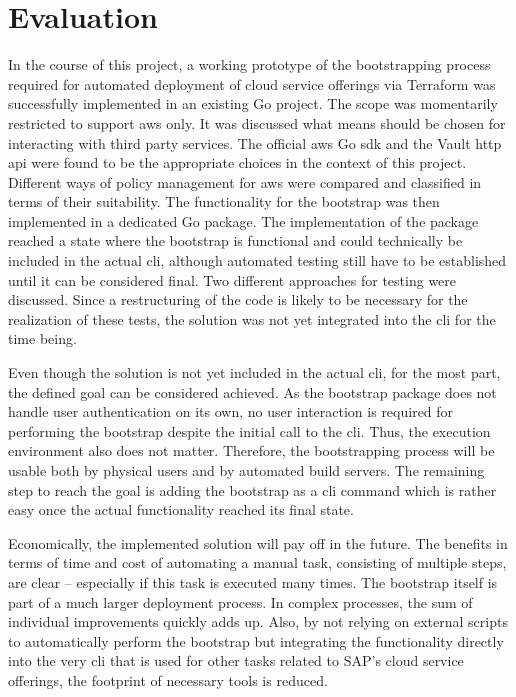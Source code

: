 \chapter{Evaluation}
In the course of this project, a working prototype of the bootstrapping process required for automated deployment of cloud service offerings via Terraform was successfully implemented in an existing Go project.
The scope was momentarily restricted to support \ac{aws} only.
It was discussed what means should be chosen for interacting with third party services.
The official \ac{aws} Go \ac{sdk} and the Vault \ac{http} \ac{api} were found to be the appropriate choices in the context of this project.
Different ways of policy management for \ac{aws} were compared and classified in terms of their suitability.
The functionality for the bootstrap was then implemented in a dedicated Go package.
The implementation of the package reached a state where the bootstrap is functional and could technically be included in the actual \ac{cli}, although automated testing still have to be established until it can be considered final.
Two different approaches for testing were discussed.
Since a restructuring of the code is likely to be necessary for the realization of these tests, the solution was not yet integrated into the \ac{cli} for the time being.

Even though the solution is not yet included in the actual \ac{cli}, for the most part, the defined goal can be considered achieved.
As the bootstrap package does not handle user authentication on its own, no user interaction is required for performing the bootstrap despite the initial call to the \ac{cli}.
Thus, the execution environment also does not matter.
Therefore, the bootstrapping process will be usable both by physical users and by automated build servers.
The remaining step to reach the goal is adding the bootstrap as a \ac{cli} command which is rather easy once the actual functionality reached its final state.

Economically, the implemented solution will pay off in the future.
The benefits in terms of time and cost of automating a manual task, consisting of multiple steps, are clear -- especially if this task is executed many times.
The bootstrap itself is part of a much larger deployment process.
In complex processes, the sum of individual improvements quickly adds up.
Also, by not relying on external scripts to automatically perform the bootstrap but integrating the functionality directly into the very \ac{cli} that is used for other tasks related to SAP's cloud service offerings, the footprint of necessary tools is reduced.



